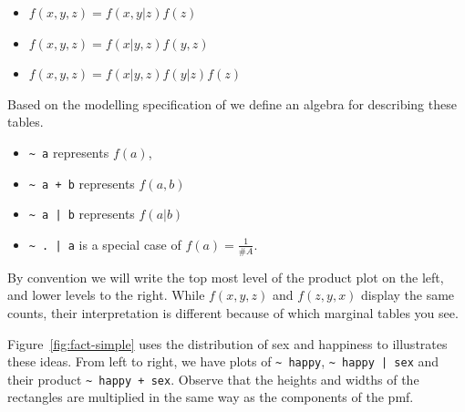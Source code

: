 \documentclass[letterpaper,oneside]{scrartcl}
\begin{document}
\begin{itemize}
  \item $f(x, y, z) = f(x, y | z) f(z)$
  \item $f(x, y, z) = f(x | y, z) f(y, z)$
  \item $f(x, y, z) = f(x | y, z) f(y | z) f(z)$
\end{itemize}

%
%
%
%

Based on the modelling specification of \citet{wilkinson:1973} we define an algebra for describing these tables.

\begin{itemize}
  \item \verb|~ a| represents $f(a)$,
  \item \verb|~ a + b| represents $f(a, b)$
  \item \verb!~ a | b! represents $f(a | b)$
  \item \verb!~ . | a! is a special case of $f(a) = \frac{1}{\#A}$.
\end{itemize}

By convention we will write the top most level of the product plot on the left, and lower levels to the right.  While $f(x, y, z)$ and $f(z, y, x)$ display the same counts, their interpretation is different because of which marginal tables you see.

Figure~\ref{fig:fact-simple} uses the distribution of sex and happiness to illustrates these ideas. From left to right, we have plots of \verb|~ happy|, \verb!~ happy | sex! and their product \verb|~ happy + sex|.  Observe that the heights and widths of the rectangles are multiplied in the same way as the components of the pmf.
\end{document}

